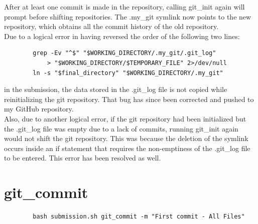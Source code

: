 \documentclass{article}
\begin{document}
    After at least one commit is made in the repository, calling git\_init again will prompt before shifting repositories. The .my\_git symlink now points to the new repository, which obtains all the commit history of the old repository.\\
    Due to a logical error in having reversed the order of the following two lines:
    \begin{lstlisting}
        grep -Ev "^$" "$WORKING_DIRECTORY/.my_git/.git_log" 
            > "$WORKING_DIRECTORY/$TEMPORARY_FILE" 2>/dev/null
        ln -s "$final_directory" "$WORKING_DIRECTORY/.my_git"
    \end{lstlisting}
    in the submission, the data stored in the .git\_log file is not copied while reinitializing the git repository. That bug has since been corrected and pushed to my GitHub repository\cite{url:github}.\\
    Also, due to another logical error, if the git repository had been initialized but the .git\_log file was empty due to a lack of commits, running git\_init again would not shift the git repository. This was because the deletion of the symlink occurs inside an if statement that requires the non-emptiness of the .git\_log file to be entered. This error has been resolved as well.\\

    \section{git\_commit}
    \begin{lstlisting}
        bash submission.sh git_commit -m "First commit - All Files"
    \end{lstlisting}
\end{document}

